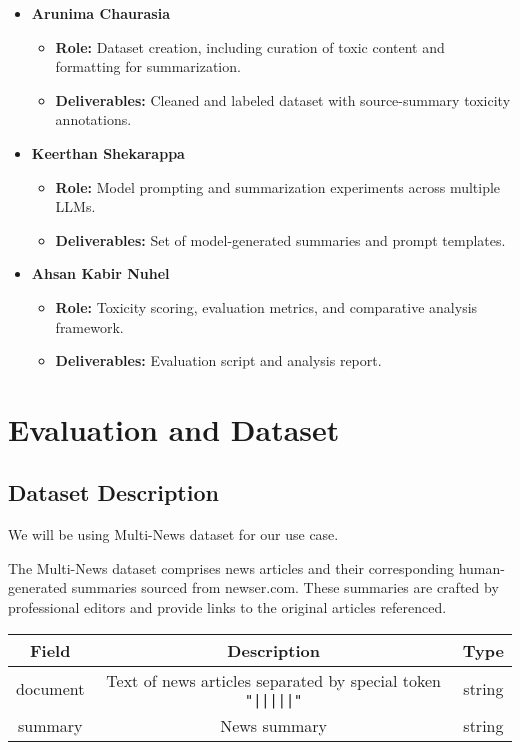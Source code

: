\documentclass{article}
\begin{document}
\begin{itemize}
    \item \textbf{Arunima Chaurasia}
    \begin{itemize}
        \item \textbf{Role:} Dataset creation, including curation of toxic content and formatting for summarization.
        \item \textbf{Deliverables:} Cleaned and labeled dataset with source-summary toxicity annotations.
    \end{itemize}
    \item \textbf{Keerthan Shekarappa}
    \begin{itemize}
        \item \textbf{Role:} Model prompting and summarization experiments across multiple LLMs.
        \item \textbf{Deliverables:} Set of model-generated summaries and prompt templates.
    \end{itemize}
    \item \textbf{Ahsan Kabir Nuhel}
    \begin{itemize}
        \item \textbf{Role:} Toxicity scoring, evaluation metrics, and comparative analysis framework.
        \item \textbf{Deliverables:} Evaluation script and analysis report.
    \end{itemize}
\end{itemize}

\section{Evaluation and Dataset}

\subsection{Dataset Description}
We will be using Multi-News dataset \cite{alex2019multinews} for our use case.


The Multi-News dataset comprises news articles and their corresponding human-generated summaries sourced from newser.com. These summaries are crafted by professional editors and provide links to the original articles referenced.


    \begin{tabular}{|c|c|c|}
        \hline
        \textbf{Field} & \textbf{Description} & \textbf{Type} \\
        \hline
        document & Text of news articles separated by special token \texttt{"|||||"} & string \\
        \hline
        summary & News summary & string \\
        \hline
    \end{tabular}
\end{document}

